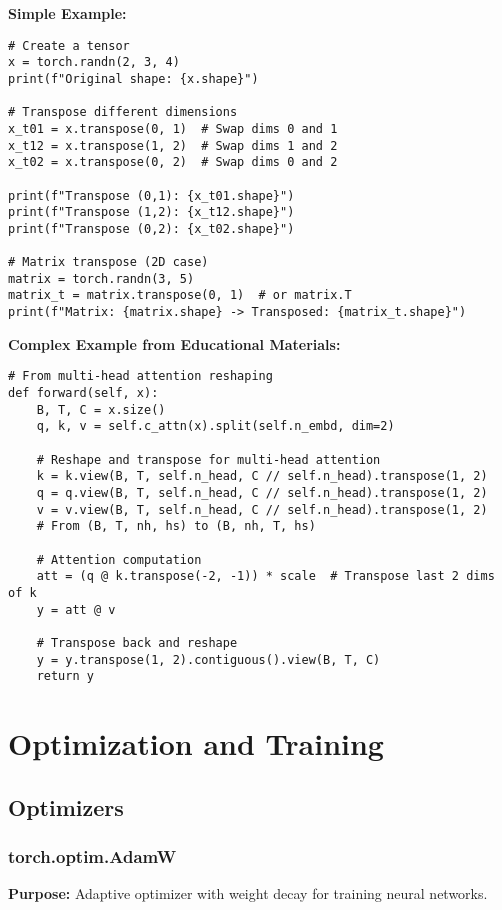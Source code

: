 \documentclass[11pt,a4paper]{book}
\begin{document}
\textbf{Simple Example:}
\begin{verbatim}
# Create a tensor
x = torch.randn(2, 3, 4)
print(f"Original shape: {x.shape}")

# Transpose different dimensions
x_t01 = x.transpose(0, 1)  # Swap dims 0 and 1
x_t12 = x.transpose(1, 2)  # Swap dims 1 and 2
x_t02 = x.transpose(0, 2)  # Swap dims 0 and 2

print(f"Transpose (0,1): {x_t01.shape}")
print(f"Transpose (1,2): {x_t12.shape}")
print(f"Transpose (0,2): {x_t02.shape}")

# Matrix transpose (2D case)
matrix = torch.randn(3, 5)
matrix_t = matrix.transpose(0, 1)  # or matrix.T
print(f"Matrix: {matrix.shape} -> Transposed: {matrix_t.shape}")
\end{verbatim}

\textbf{Complex Example from Educational Materials:}
\begin{verbatim}
# From multi-head attention reshaping
def forward(self, x):
    B, T, C = x.size()
    q, k, v = self.c_attn(x).split(self.n_embd, dim=2)
    
    # Reshape and transpose for multi-head attention
    k = k.view(B, T, self.n_head, C // self.n_head).transpose(1, 2)
    q = q.view(B, T, self.n_head, C // self.n_head).transpose(1, 2)
    v = v.view(B, T, self.n_head, C // self.n_head).transpose(1, 2)
    # From (B, T, nh, hs) to (B, nh, T, hs)
    
    # Attention computation
    att = (q @ k.transpose(-2, -1)) * scale  # Transpose last 2 dims of k
    y = att @ v
    
    # Transpose back and reshape
    y = y.transpose(1, 2).contiguous().view(B, T, C)
    return y
\end{verbatim}

\chapter{Optimization and Training}

\section{Optimizers}

\subsection{torch.optim.AdamW}

\textbf{Purpose:} Adaptive optimizer with weight decay for training neural networks.
\end{document}
